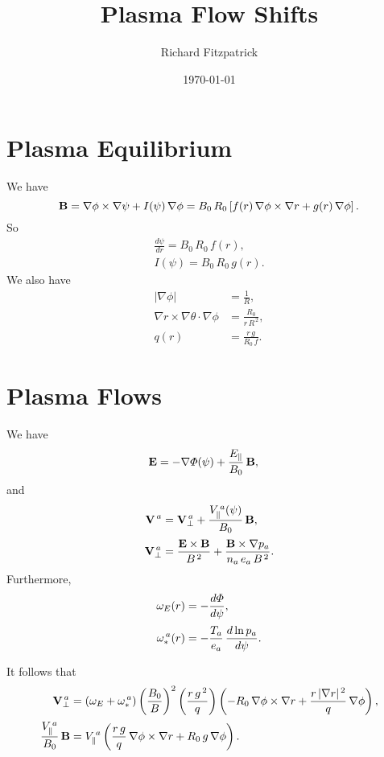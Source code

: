 \documentclass[12pt]{article}
\title{\bf Plasma Flow Shifts}
\date{\today}
\author{Richard Fitzpatrick}
\begin{document}
\maketitle

\section{Plasma Equilibrium}
We have
\begin{equation}
{\bf B} = \nabla\phi\times\nabla\psi + I(\psi)\,\nabla\phi = B_0\,R_0\left[f(r)\,\nabla\phi\times \nabla r+g(r)\,\nabla\phi\right].
\end{equation}
So
\begin{align}
\frac{d\psi}{dr}= B_0\,R_0\,f(r),\\[0.5ex]
I(\psi) = B_0\,R_0\,g(r).
\end{align}
We also have
\begin{align}
|\nabla\phi| &= \frac{1}{R},\\[0.5ex]
\nabla r\times \nabla\theta\cdot\nabla\phi &= \frac{R_0}{r\,R^{\,2}},\\[0.5ex]
q(r)&= \frac{r\,g}{R_0\,f}.
\end{align}

\section{Plasma Flows}
We have
\begin{align}
{\bf E}& = - \nabla{\mit\Phi}(\psi) + \frac{E_\parallel}{B_0}\,{\bf B},
\end{align}
and
\begin{align}
{\bf V}^{\,a} &= {\bf V}_\perp^{\,a} + \frac{V_\parallel^{\,a}(\psi)}{B_0}\,{\bf B},\\[0.5ex]
{\bf V}_\perp^{\,a} &= \frac{{\bf E}\times {\bf B}}{B^{\,2}} + \frac{{\bf B}\times \nabla p_a}{n_a\,e_a\,B^{\,2}}.
\end{align}
Furthermore,
\begin{align}
\omega_E(r) &= - \frac{d{\mit\Phi}}{d\psi},\\[0.5ex]
\omega_\ast^{\,a}(r)&= - \frac{T_a}{e_a}\,\frac{d\ln p_a}{d\psi}.
\end{align}

It follows that
\begin{align}
{\bf V}_\perp^{\,a} &= (\omega_E+\omega_\ast^{\,a})\left(\frac{B_0}{B}\right)^2\left(\frac{r\,g^{\,2}}{q}\right)
\left(-R_0\,\nabla\phi\times \nabla r + \frac{r\,|\nabla r|^{\,2}}{q}\,\nabla\phi\right),\\[0.5ex]
\frac{V_\parallel^{\,a}}{B_0}\,{\bf B} &= V_\parallel^{\,a}\left(\frac{r\,g}{q}\,\nabla\phi\times \nabla r + R_0\,g\,\nabla\phi\right).
\end{align}
\end{document}
